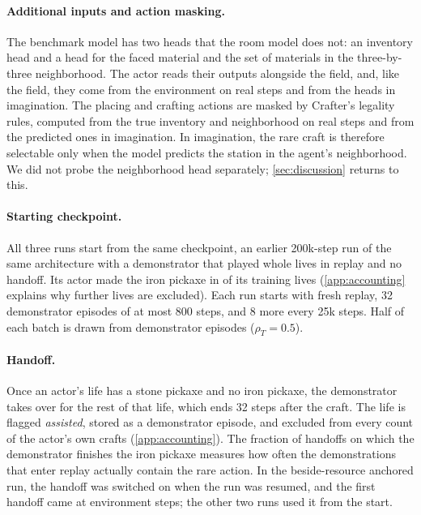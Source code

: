 \paragraph{Additional inputs and action masking.}
The benchmark model has two heads that the room model does not: an inventory head and a head for the faced material and the set of materials in the three-by-three neighborhood.
The actor reads their outputs alongside the field, and, like the field, they come from the environment on real steps and from the heads in imagination.
The placing and crafting actions are masked by Crafter's legality rules, computed from the true inventory and neighborhood on real steps and from the predicted ones in imagination.
In imagination, the rare craft is therefore selectable only when the model predicts the station in the agent's neighborhood.
We did not probe the neighborhood head separately; \cref{sec:discussion} returns to this.

\paragraph{Starting checkpoint.}
All three runs start from the same checkpoint, an earlier 200k-step run of the same architecture with a demonstrator that played whole lives in replay and no handoff.
Its actor made the iron pickaxe in \StartRare{} of its \StartLives{} training lives (\cref{app:accounting} explains why \StartSpanning{} further lives are excluded).
Each run starts with fresh replay, 32 demonstrator episodes of at most 800 steps, and 8 more every 25k steps.
Half of each batch is drawn from demonstrator episodes ($\rho_T=0.5$).

\paragraph{Handoff.}
Once an actor's life has a stone pickaxe and no iron pickaxe, the demonstrator takes over for the rest of that life, which ends 32 steps after the craft.
The life is flagged \emph{assisted}, stored as a demonstrator episode, and excluded from every count of the actor's own crafts (\cref{app:accounting}).
The fraction of handoffs on which the demonstrator finishes the iron pickaxe measures how often the demonstrations that enter replay actually contain the rare action.
In the beside-resource anchored run, the handoff was switched on when the run was resumed, and the first handoff came at \FirstHandoffBeside{} environment steps; the other two runs used it from the start.

